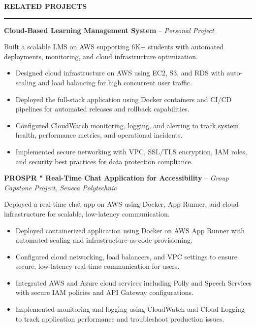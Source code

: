 \documentclass[10pt,letterpaper]{article}
\begin{document}
\vspace{6pt}

\textbf{RELATED PROJECTS}\\[-8pt]
\noindent\rule{\textwidth}{1pt}

\vspace{-2pt}

\textbf{Cloud-Based Learning Management System} -- \emph{Personal Project}

\vspace{-1pt}

Built a scalable LMS on AWS supporting 6K+ students with automated deployments, monitoring, and cloud infrastructure optimization.
\vspace{-1pt}
\begin{itemize}
\item Designed cloud infrastructure on AWS using EC2, S3, and RDS with auto-scaling and load balancing for high concurrent user traffic.
\item Deployed the full-stack application using Docker containers and CI/CD pipelines for automated releases and rollback capabilities.
\item Configured CloudWatch monitoring, logging, and alerting to track system health, performance metrics, and operational incidents.
\item Implemented secure networking with VPC, SSL/TLS encryption, IAM roles, and security best practices for data protection compliance.
\end{itemize}

\textbf{PROSPR " Real-Time Chat Application for Accessibility} -- \emph{Group Capstone Project, Seneca Polytechnic}

\vspace{-1pt}

Deployed a real-time chat app on AWS using Docker, App Runner, and cloud infrastructure for scalable, low-latency communication.
\vspace{-1pt}
\begin{itemize}
\item Deployed containerized application using Docker on AWS App Runner with automated scaling and infrastructure-as-code provisioning.
\item Configured cloud networking, load balancers, and VPC settings to ensure secure, low-latency real-time communication for users.
\item Integrated AWS and Azure cloud services including Polly and Speech Services with secure IAM policies and API Gateway configurations.
\item Implemented monitoring and logging using CloudWatch and Cloud Logging to track application performance and troubleshoot production issues.
\end{itemize}
\end{document}
